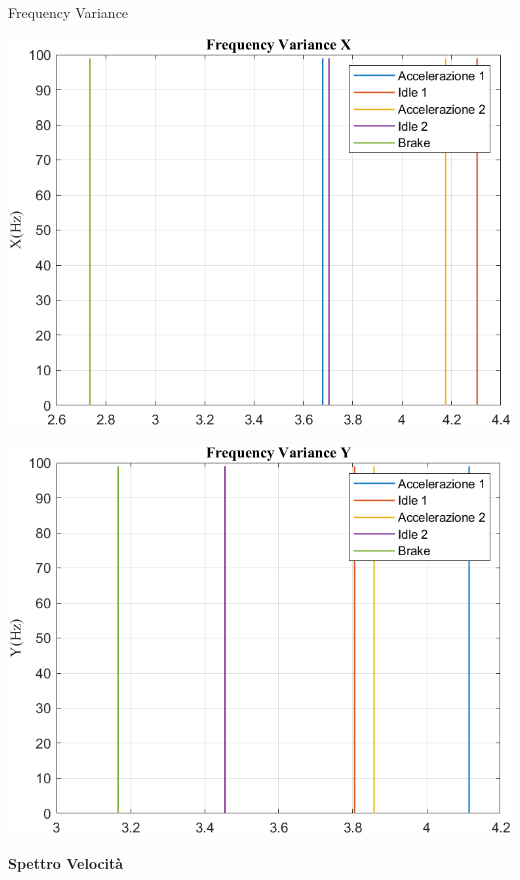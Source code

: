 \documentclass[beamer]{standalone}
\begin{document}
	\begin{frame}{{Frequency Variance}}
		\begin{minipage}{.45\textwidth}
			\centering\includegraphics[width=.9\textwidth]{figure/Vel/Trasformata/Frequency VarianceX}
		\end{minipage}
		\hspace{.05\textwidth}
		\begin{minipage}{.45\textwidth}
			\centering\includegraphics[width=.9\textwidth]{figure/Vel/Trasformata/Frequency VarianceY}
		\end{minipage}
	\end{frame}
	
	\begin{frame}
		\color{blue}\centering\huge{\textbf{Spettro Velocità}}
	\end{frame}
	
\end{document}
